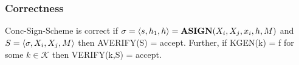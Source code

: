 \begin{frame}
	\frametitle{Correctness}

	Conc-Sign-Scheme is correct if $\sigma=\langle s,h_1,h \rangle=\textbf{ASIGN}(X_i, X_j,x_i,h,M)$ and $S=\langle \sigma, X_i, X_j,M \rangle$ then AVERIFY(S) = accept. Further, if KGEN(k) = f for some $k\in\mathcal{K}$ then VERIFY(k,S) = accept. 
\end{frame}